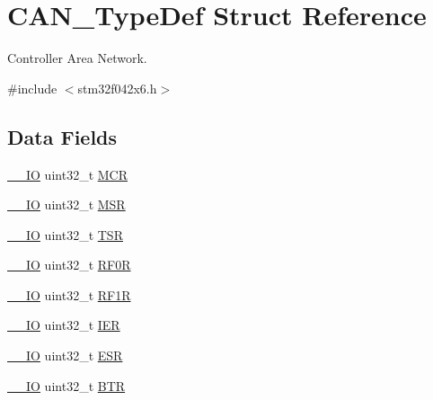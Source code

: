 \hypertarget{struct_c_a_n___type_def}{}\section{C\+A\+N\+\_\+\+Type\+Def Struct Reference}
\label{struct_c_a_n___type_def}


Controller Area Network.  




{\ttfamily \#include $<$stm32f042x6.\+h$>$}

\subsection*{Data Fields}
\begin{DoxyCompactItemize}
\item 
\hyperlink{core__sc300_8h_aec43007d9998a0a0e01faede4133d6be}{\+\_\+\+\_\+\+IO} uint32\+\_\+t \hyperlink{struct_c_a_n___type_def_a27af4e9f888f0b7b1e8da7e002d98798}{M\+CR}
\item 
\hyperlink{core__sc300_8h_aec43007d9998a0a0e01faede4133d6be}{\+\_\+\+\_\+\+IO} uint32\+\_\+t \hyperlink{struct_c_a_n___type_def_acdd4c1b5466be103fb2bb2a225b1d3a9}{M\+SR}
\item 
\hyperlink{core__sc300_8h_aec43007d9998a0a0e01faede4133d6be}{\+\_\+\+\_\+\+IO} uint32\+\_\+t \hyperlink{struct_c_a_n___type_def_a87e3001757a0cd493785f1f3337dd0e8}{T\+SR}
\item 
\hyperlink{core__sc300_8h_aec43007d9998a0a0e01faede4133d6be}{\+\_\+\+\_\+\+IO} uint32\+\_\+t \hyperlink{struct_c_a_n___type_def_accf4141cee239380d0ad4634ee21dbf6}{R\+F0R}
\item 
\hyperlink{core__sc300_8h_aec43007d9998a0a0e01faede4133d6be}{\+\_\+\+\_\+\+IO} uint32\+\_\+t \hyperlink{struct_c_a_n___type_def_a02b589bb589df4f39e549dca4d5abb08}{R\+F1R}
\item 
\hyperlink{core__sc300_8h_aec43007d9998a0a0e01faede4133d6be}{\+\_\+\+\_\+\+IO} uint32\+\_\+t \hyperlink{struct_c_a_n___type_def_a6566f8cfbd1d8aa7e8db046aa35e77db}{I\+ER}
\item 
\hyperlink{core__sc300_8h_aec43007d9998a0a0e01faede4133d6be}{\+\_\+\+\_\+\+IO} uint32\+\_\+t \hyperlink{struct_c_a_n___type_def_a2b39f943954e0e7d177b511d9074a0b7}{E\+SR}
\item 
\hyperlink{core__sc300_8h_aec43007d9998a0a0e01faede4133d6be}{\+\_\+\+\_\+\+IO} uint32\+\_\+t \hyperlink{struct_c_a_n___type_def_a5c0fcd3e7b4c59ab1dd68f6bd8f74e07}{B\+TR}
\item 

\end{DoxyCompactItemize}
